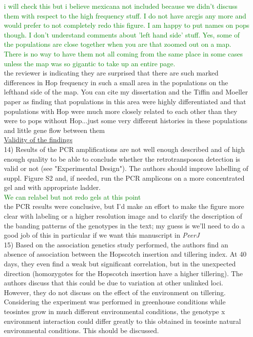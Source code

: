\documentclass[11pt]{article}
\newcommand{\lev}[1]{\noindent \textcolor{green}{{#1}} \\}
\newcommand{\mbh}[1]{\noindent \textcolor{Dandelion}{{#1}}\\}
\begin{document}
\lev{i will check this but i believe mexicana not included because we didn't discuss them with respect to the high frequency stuff. I do not have arcgis any more and would prefer to not completely redo this figure. I am happy to put names on pops though. I don't understand comments about 'left hand side' stuff. Yes, some of the populations are close together when you are that zoomed out on a map. There is no way to have them not all coming from the same place in some cases unless the map was so gigantic to take up an entire page.}

\mbh{the reviewer is indicating they are surprised that there are such marked differences in Hop frequency in such a small area in the populations on the lefthand side of the map.  You can cite my dissertation and the Tiffin and Moeller paper as finding that populations in this area were highly differentiated and that populations with Hop were much more closely related to each other than they were to pops without Hop...just some very different histories in these populations and little gene flow between them}

\underline{Validity of the findings}\\

14) Results of the PCR amplifications are not well enough described and of high enough quality to be able to conclude whether the retrotransposon detection is valid or not (see "Experimental Design"). The authors should improve labelling of suppl. Figure S2 and, if needed, run the PCR amplicons on a more concentrated gel and with appropriate ladder.\\

\lev{We can relabel but not redo gels at this point}
\mbh{the PCR results were conclusive, but I'd make an effort to make the figure more clear with labeling or a higher resolution image and to clarify the description of the banding patterns of the genotypes in the text; my guess is we'll need to do a good job of this in particular if we want this manuscript in \emph{PeerJ}}  

15) Based on the association genetics study performed, the authors find an absence of association between the Hopscotch insertion and tillering index. At 40 days, they even find a weak but significant correlation, but in the unexpected direction (homozygotes for the Hopscotch insertion have a higher tillering). The authors discuss that this could be due to variation at other unlinked loci. However, they do not discuss on the effect of the environment on tillering. Considering the experiment was performed in greenhouse conditions while teosintes grow in much different environmental conditions, the genotype x environment interaction could differ greatly to this obtained in teosinte natural environmental conditions. This should be discussed.\\
\end{document}
